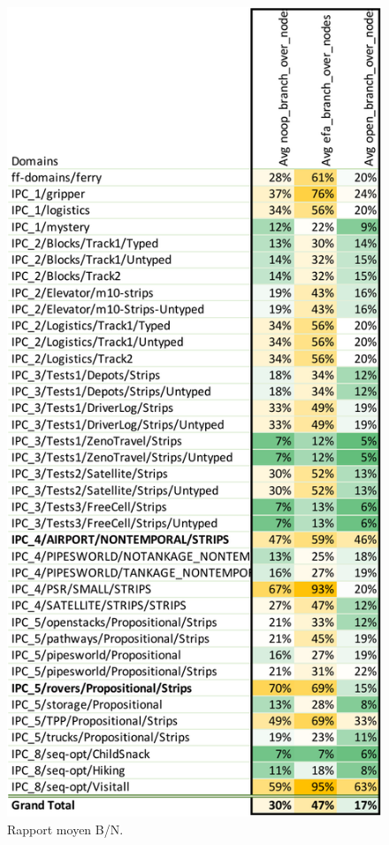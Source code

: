 \begin{figure}[ht!] \centering
\begin{center} \includegraphics[width=.75\textwidth]{figures/experiment-branch_vs_nodes-crop.pdf} \end{center}
\caption{Rapport moyen B/N.}
\label{fig:tab-exp-branch-vs-nodes}
\end{figure}

